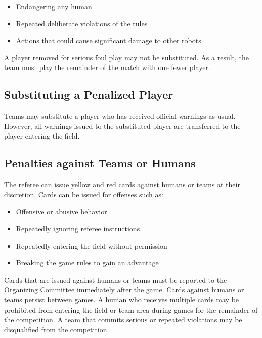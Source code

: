 \begin{itemize}
  \item Endangering any human
  \item Repeated deliberate violations of the rules
  \item Actions that could cause significant damage to other robots
\end{itemize}

A player removed for serious foul play may not be substituted. As a result, the team must play the remainder of the match with one fewer player.

\subsection{Substituting a Penalized Player}
\label{sec:substituting_a_penalized_player}

Teams may substitute a player who has received official warnings as usual. However, all warnings issued to the substituted player are transferred to the player entering the field.

\subsection{Penalties against Teams or Humans}
\label{sec:penalties_against_humans}

The referee can issue yellow and red cards against humans or teams at their discretion. Cards can be issued for offenses such as:

\begin{itemize}
  \item Offensive or abusive behavior
  \item Repeatedly ignoring referee instructions
  \item Repeatedly entering the field without permission
  \item Breaking the game rules to gain an advantage
\end{itemize}

Cards that are issued against humans or teams must be reported to the Organizing Committee immediately after the game. Cards against humans or teams persist between games. A human who receives multiple cards may be prohibited from entering the field or team area during games for the remainder of the competition. A team that commits serious or repeated violations may be disqualified from the competition. 